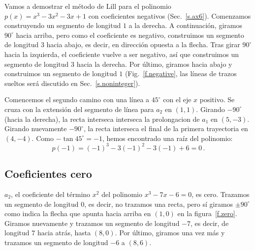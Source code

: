 Vamos a demostrar el método de Lill para el polinomio $p(x)=x^3-3x^2-3x+1$ con coeficientes negativos (Sec.~\ref{s.ax6}). Comenzamos construyendo un segmento de longitud $1$ a la derecha. A continuación, giramos $90^\circ$ hacia arriba, pero como el coeficiente es negativo, construimos un segmento de longitud $3$ hacia abajo, es decir, en dirección opuesta a la flecha. Tras girar $90^\circ$ hacia la izquierda, el coeficiente vuelve a ser negativo, así que construimos un segmento de longitud $3$ hacia la derecha. Por último, giramos hacia abajo y construimos un segmento de longitud $ 1 $ (Fig.~\ref{f.negative}, las líneas de trazos sueltos será discutido en Sec.~\ref{s.noninteger}).

Comencemos el segundo camino con una línea a $ 45^\circ$ con el eje $x$ positivo. Se cruza con la extensión del segmento de línea para $a_2$ en $(1,1)$. Girando $-90^\circ$ (hacia la derecha), la recta interseca  interseca la prolongacion de $a_1$ en $(5,-3)$. Girando nuevamente $-90^\circ$, la recta interseca el final de la primera trayectoria en $(4,-4)$. Como $-\tan 45^\circ=-1$, hemos encontrado una raíz del polinomio:
\[p(-1)=(-1)^3-3(-1)^2-3(-1)+6=0\,.\]


\subsection{Coeficientes cero}\label{s.zero}
$a_2$, el coeficiente del término $x^2$ del polinomio $x^3-7x-6=0$, es cero. Trazamos un segmento de longitud $0$, es decir, no trazamos una recta, pero sí giramos $\pm 90^\circ$ como indica la flecha que apunta hacia arriba en $(1,0)$ en la figura~\ref{f.zero}. Giramos nuevamente y trazamos un segmento de longitud $-7$, es decir, de longitud $7$ hacia atrás, hasta $(8,0)$. Por último, giramos una vez más y trazamos un segmento de longitud $-6 $ a $(8,6)$.

